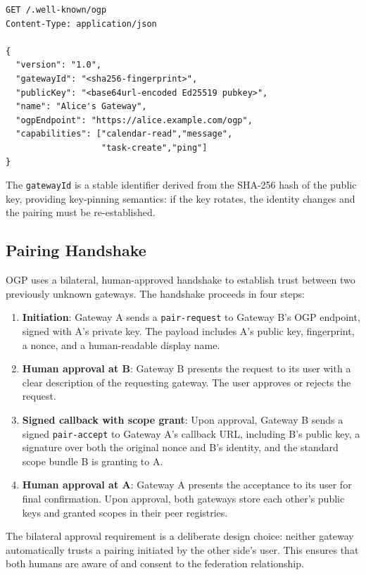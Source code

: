 \documentclass[conference]{IEEEtran}
\begin{document}
\begin{lstlisting}
GET /.well-known/ogp
Content-Type: application/json

{
  "version": "1.0",
  "gatewayId": "<sha256-fingerprint>",
  "publicKey": "<base64url-encoded Ed25519 pubkey>",
  "name": "Alice's Gateway",
  "ogpEndpoint": "https://alice.example.com/ogp",
  "capabilities": ["calendar-read","message",
                   "task-create","ping"]
}
\end{lstlisting}

The \texttt{gatewayId} is a stable identifier derived from the SHA-256 hash of the public key, providing key-pinning semantics: if the key rotates, the identity changes and the pairing must be re-established.

\subsection{Pairing Handshake}

OGP uses a bilateral, human-approved handshake to establish trust between two previously unknown gateways. The handshake proceeds in four steps:

\begin{enumerate}
  \item \textbf{Initiation}: Gateway A sends a \texttt{pair-request} to Gateway B's OGP endpoint, signed with A's private key. The payload includes A's public key, fingerprint, a nonce, and a human-readable display name.
  \item \textbf{Human approval at B}: Gateway B presents the request to its user with a clear description of the requesting gateway. The user approves or rejects the request.
  \item \textbf{Signed callback with scope grant}: Upon approval, Gateway B sends a signed \texttt{pair-accept} to Gateway A's callback URL, including B's public key, a signature over both the original nonce and B's identity, and the standard scope bundle B is granting to A.
  \item \textbf{Human approval at A}: Gateway A presents the acceptance to its user for final confirmation. Upon approval, both gateways store each other's public keys and granted scopes in their peer registries.
\end{enumerate}

The bilateral approval requirement is a deliberate design choice: neither gateway automatically trusts a pairing initiated by the other side's user. This ensures that both humans are aware of and consent to the federation relationship.
\end{document}
